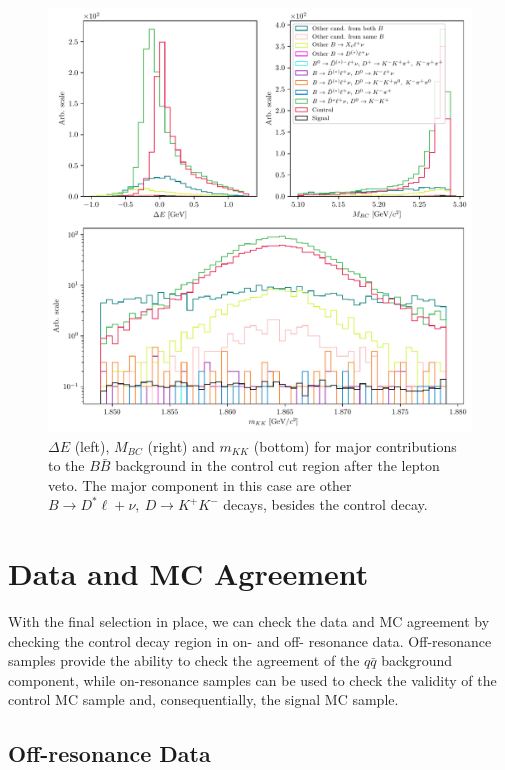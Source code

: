 \begin{figure}[H]
	\centering
	\captionsetup{width=0.8\linewidth}
	\includegraphics[width=\linewidth]{fig/cs_BKG_composition_after}
	\caption{$\Delta E$ (left), $M_{BC}$ (right) and $m_{KK}$ (bottom) for major contributions to the $B \bar B$ background in the control cut region after the lepton veto. The major component in this case are other $B \to D^* \ell+ \nu,~D \to K^+K^-$ decays, besides the control decay.}
	\label{fig:cs_bkg_after}
\end{figure} 

\section{Data and MC Agreement}

With the final selection in place, we can check the data and MC agreement by checking the control decay region in on- and off- resonance data. Off-resonance samples provide the ability to check the agreement of the $q\bar q$ background component, while on-resonance samples can be used to check the validity of the control MC sample and, consequentially, the signal MC sample.

\subsection{Off-resonance Data}

